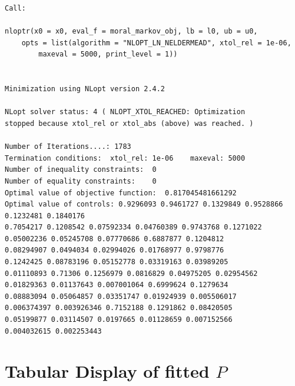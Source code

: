 \documentclass{amsart}
\begin{document}
\begin{verbatim}
Call:

nloptr(x0 = x0, eval_f = moral_markov_obj, lb = l0, ub = u0, 
    opts = list(algorithm = "NLOPT_LN_NELDERMEAD", xtol_rel = 1e-06, 
        maxeval = 5000, print_level = 1))


Minimization using NLopt version 2.4.2 

NLopt solver status: 4 ( NLOPT_XTOL_REACHED: Optimization 
stopped because xtol_rel or xtol_abs (above) was reached. )

Number of Iterations....: 1783 
Termination conditions:  xtol_rel: 1e-06	maxeval: 5000 
Number of inequality constraints:  0 
Number of equality constraints:    0 
Optimal value of objective function:  0.817045481661292 
Optimal value of controls: 0.9296093 0.9461727 0.1329849 0.9528866 0.1232481 0.1840176 
0.7054217 0.1208542 0.07592334 0.04760389 0.9743768 0.1271022 
0.05002236 0.05245708 0.07770686 0.6887877 0.1204812 
0.08294907 0.0494034 0.02994026 0.01768977 0.9798776 
0.1242425 0.08783196 0.05152778 0.03319163 0.03989205 
0.01110893 0.71306 0.1256979 0.0816829 0.04975205 0.02954562 
0.01829363 0.01137643 0.007001064 0.6999624 0.1279634 
0.08883094 0.05064857 0.03351747 0.01924939 0.005506017 
0.006374397 0.003926346 0.7152188 0.1291862 0.08420505 
0.05199877 0.03114507 0.0197665 0.01128659 0.007152566 
0.004032615 0.002253443
\end{verbatim}

\section{Tabular Display of fitted $P$}
\end{document}
